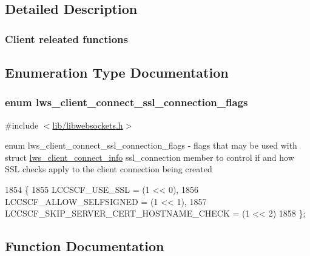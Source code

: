 \subsection{Detailed Description}
\subsubsection*{Client releated functions}

\subsection{Enumeration Type Documentation}
\subsubsection[{\texorpdfstring{lws\+\_\+client\+\_\+connect\+\_\+ssl\+\_\+connection\+\_\+flags}{lws\_client\_connect\_ssl\_connection\_flags}}]{\setlength{\rightskip}{0pt plus 5cm}enum {\bf lws\+\_\+client\+\_\+connect\+\_\+ssl\+\_\+connection\+\_\+flags}}\hypertarget{group__client_ga96f3dbad54b2853969cfa933d66871ce}{}\label{group__client_ga96f3dbad54b2853969cfa933d66871ce}


{\ttfamily \#include $<$\hyperlink{libwebsockets_8h}{lib/libwebsockets.\+h}$>$}

enum lws\+\_\+client\+\_\+connect\+\_\+ssl\+\_\+connection\+\_\+flags -\/ flags that may be used with struct \hyperlink{structlws__client__connect__info}{lws\+\_\+client\+\_\+connect\+\_\+info} ssl\+\_\+connection member to control if and how S\+SL checks apply to the client connection being created 
\begin{DoxyCode}
1854                                              \{
1855         LCCSCF\_USE\_SSL                          = (1 << 0),
1856         LCCSCF\_ALLOW\_SELFSIGNED                 = (1 << 1),
1857         LCCSCF\_SKIP\_SERVER\_CERT\_HOSTNAME\_CHECK  = (1 << 2)
1858 \};
\end{DoxyCode}


\subsection{Function Documentation}
